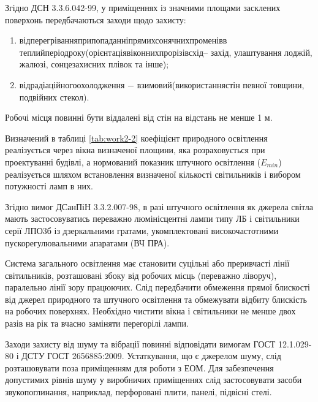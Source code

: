 Згідно ДСН 3.3.6.042-99, у приміщеннях із значними площами засклених поверхонь передбачаються заходи щодо захисту:

\begin{enumerate}
	\item від\hfill перегрівання\hfill при\hfill попаданні\hfill прямих\hfill сонячних\hfill променів\hfill в\newline \hspace*{-18mm} теплий\hfill період\hfill року\hfill (орієнтація\hfill віконних\hfill прорізів\hfill схід\hfill – захід,\newline \hspace*{-18mm} улаштування лоджій, жалюзі, сонцезахисних плівок та інше);
	\item від\hfill радіаційного\hfill охолодження $-$ в\hfill зимовий\hfill (використання\hfill стін\newline \hspace*{-18mm} певної товщини, подвійних стекол).
\end{enumerate}

Робочі місця повинні бути віддалені від стін на відстань не менше 1 м. 

Визначений в таблиці \ref{tab:work2-2} коефіцієнт природного освітлення реалізується через вікна визначеної площини, яка розраховується при проектуванні будівлі, а нормований показник штучного освітлення ($E_{min}$) реалізується шляхом встановлення визначеної кількості світильників і вибором потужності ламп в них.

Згідно вимог ДСанПіН 3.3.2.007-98, в разі штучного освітлення як джерела світла мають застосовуватись переважно люмінісцентні лампи типу ЛБ і світильники серії ЛПО3б із дзеркальними гратами, укомплектовані високочастотними пускорегулювальними апаратами (ВЧ ПРА).

Система загального освітлення має становити суцільні або преривчасті лінії світильників, розташовані збоку від робочих місць (переважно ліворуч), паралельно лінії зору працюючих. Слід передбачити обмеження прямої блискості від джерел природного та штучного освітлення та обмежувати відбиту блискість на робочих поверхнях. Необхідно чистити вікна і світильники не менше двох разів на рік та вчасно заміняти перегорілі лампи.

Заходи захисту від шуму та вібрації повинні відповідати вимогам ГОСТ 12.1.029-80 і ДСТУ ГОСТ 2656885:2009. Устаткування, що є джерелом шуму, слід розташовувати поза приміщенням для роботи з ЕОМ. Для забезпечення допустимих рівнів шуму у виробничих приміщеннях слід застосовувати засоби звукопоглинання, наприклад, перфоровані плити, панелі, підвісні стелі.

